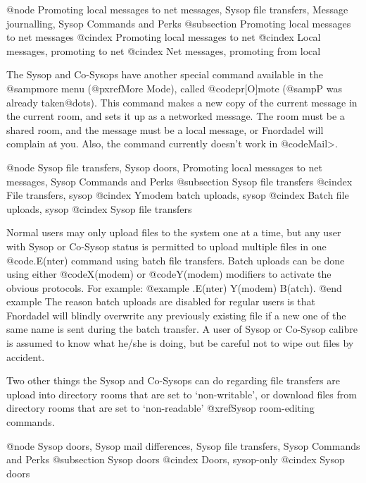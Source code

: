 @node Promoting local messages to net messages, Sysop file transfers, Message journalling, Sysop Commands and Perks
@subsection Promoting local messages to net messages
@cindex Promoting local messages to net
@cindex Local messages, promoting to net
@cindex Net messages, promoting from local

The Sysop and Co-Sysops have another special command available in the
@samp{more} menu (@pxref{More Mode}), called @code{pr[O]mote} (@samp{P}
was already taken@dots{}).  This command makes a
new copy of the current message in the current room, and sets it up as
a networked message.  The room must be a shared room, and the message
must be a local message, or Fnordadel will complain at you.  Also, the
command currently doesn't work in @code{Mail>}.

@node Sysop file transfers, Sysop doors, Promoting local messages to net messages, Sysop Commands and Perks
@subsection Sysop file transfers
@cindex File transfers, sysop
@cindex Ymodem batch uploads, sysop
@cindex Batch file uploads, sysop
@cindex Sysop file transfers

Normal users may only upload files to the system one at a
time, but any user with Sysop or Co-Sysop status is permitted to upload multiple
files in one @code{.E(nter)} command using batch file transfers.  Batch
uploads can be done using either @code{X(modem)} or @code{Y(modem)}
modifiers to activate the obvious protocols.
For example:
@example
.E(nter) Y(modem) B(atch).
@end example
The reason batch uploads are disabled for regular users is
that Fnordadel will blindly overwrite any previously existing file
if a new one of the same name is sent during the batch transfer.  A
user of Sysop or Co-Sysop calibre is assumed to know what he/she is
doing, but be careful not to wipe out files by accident.

Two other things the Sysop and Co-Sysops can do regarding file transfers are
upload into directory rooms that are set to `non-writable', or
download files from directory rooms that are set to `non-readable'
@xref{Sysop room-editing commands}.

@node Sysop doors, Sysop mail differences, Sysop file transfers, Sysop Commands and Perks
@subsection Sysop doors
@cindex Doors, sysop-only
@cindex Sysop doors


